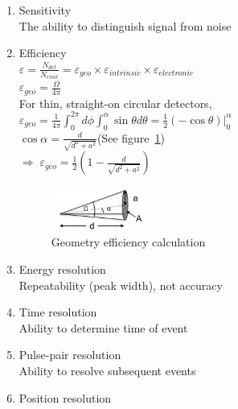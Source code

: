 \begin{enumerate}
    \item Sensitivity\\
    The ability to distinguish signal from noise
    \item Efficiency\\
    $\varepsilon=\frac{N_{det}}{N_{emit}}=\varepsilon_{geo}\times\varepsilon_{intrinsic}\times\varepsilon_{electronic}$\\
    $\varepsilon_{geo}=\frac{\Omega}{4\pi}$\\
    For thin, straight-on circular detectors,\\ $\varepsilon_{geo}=\frac{1}{4\pi}\int_0^{2\pi}d\phi\int_0^\alpha\sin\theta d\theta=\frac{1}{2}(-\cos\theta){|}_0^\alpha$\\
    $\cos\alpha=\frac{d}{\sqrt{d^a+a^2}}$(See figure~\ref{fig:geometry_efficiency_calc})\\
    $\Rightarrow\;\varepsilon_{geo}=\frac{1}{2}\left(1-\frac{d}{\sqrt{d^2+a^2}}\right)$
    \begin{figure}[ht]
    \centering
    \includegraphics[width=0.3\textwidth]{images/efficiency_geo.png}
    \caption{Geometry efficiency calculation}
    \label{fig:geometry_efficiency_calc}
    \end{figure}
    \item Energy resolution\\
    Repeatability (peak width), not accuracy 
    \item Time resolution\\
    Ability to determine time of event
    \item Pulse-pair resolution\\
    Ability to resolve subsequent events
    \item Position resolution
\end{enumerate}
